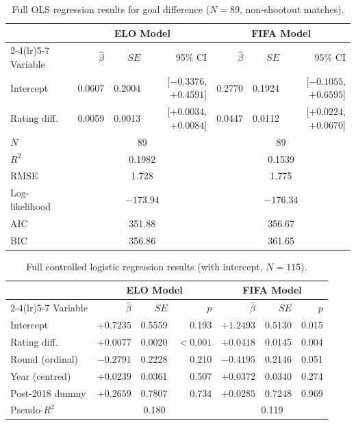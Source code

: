 \documentclass[12pt, a4paper]{article}
\begin{document}
\begin{appendices}
\begin{table}[H]
  \centering
  \caption{Full OLS regression results for goal difference ($N = 89$, non-shootout matches).}
  \label{tab:app_ols_full}
  \begin{tabular}{lrrrrrr}
    \toprule
    & \multicolumn{3}{c}{\textbf{ELO Model}} & \multicolumn{3}{c}{\textbf{FIFA Model}} \\
    \cmidrule(lr){2-4}\cmidrule(lr){5-7}
    Variable & $\hat{\beta}$ & $SE$ & 95\% CI & $\hat{\beta}$ & $SE$ & 95\% CI \\
    \midrule
    Intercept     & 0.0607  & 0.2004 & [$-0.3376$, $+0.4591$] & 0.2770 & 0.1924 & [$-0.1055$, $+0.6595$] \\
    Rating diff.  & 0.0059  & 0.0013 & [$+0.0034$, $+0.0084$] & 0.0447 & 0.0112 & [$+0.0224$, $+0.0670$] \\
    \midrule
    $N$      & \multicolumn{3}{c}{89} & \multicolumn{3}{c}{89} \\
    $R^{2}$  & \multicolumn{3}{c}{0.1982} & \multicolumn{3}{c}{0.1539} \\
    RMSE     & \multicolumn{3}{c}{1.728}  & \multicolumn{3}{c}{1.775}  \\
    Log-likelihood & \multicolumn{3}{c}{$-173.94$} & \multicolumn{3}{c}{$-176.34$} \\
    AIC      & \multicolumn{3}{c}{351.88} & \multicolumn{3}{c}{356.67} \\
    BIC      & \multicolumn{3}{c}{356.86} & \multicolumn{3}{c}{361.65} \\
    \bottomrule
  \end{tabular}
\end{table}

\begin{table}[H]
  \centering
  \caption{Full controlled logistic regression results (with intercept, $N = 115$).}
  \label{tab:app_controlled_full}
  \begin{tabular}{lrrrrrr}
    \toprule
    & \multicolumn{3}{c}{\textbf{ELO Model}} & \multicolumn{3}{c}{\textbf{FIFA Model}} \\
    \cmidrule(lr){2-4}\cmidrule(lr){5-7}
    Variable & $\hat{\beta}$ & $SE$ & $p$ & $\hat{\beta}$ & $SE$ & $p$ \\
    \midrule
    Intercept       & $+0.7235$ & 0.5559 & 0.193 & $+1.2493$ & 0.5130 & 0.015 \\
    Rating diff.    & $+0.0077$ & 0.0020 & $<0.001$ & $+0.0418$ & 0.0145 & 0.004 \\
    Round (ordinal) & $-0.2791$ & 0.2228 & 0.210 & $-0.4195$ & 0.2146 & 0.051 \\
    Year (centred)  & $+0.0239$ & 0.0361 & 0.507 & $+0.0372$ & 0.0340 & 0.274 \\
    Post-2018 dummy & $+0.2659$ & 0.7807 & 0.734 & $+0.0285$ & 0.7248 & 0.969 \\
    \midrule
    Pseudo-$R^{2}$  & \multicolumn{3}{c}{0.180} & \multicolumn{3}{c}{0.119} \\
    \bottomrule
  \end{tabular}
\end{table}


\end{appendices}
\end{document}
